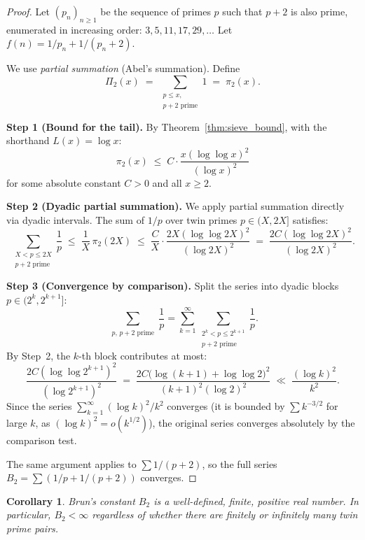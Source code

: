 \documentclass[12pt,a4paper]{amsart}
\newtheorem{corollary}[theorem]{Corollary}
\theoremstyle{definition}
\begin{document}
\begin{proof}
  Let $(p_n)_{n \geq 1}$ be the sequence of primes $p$ such that $p+2$ is
  also prime, enumerated in increasing order: $3, 5, 11, 17, 29, \ldots$
  Let $f(n) = 1/p_n + 1/(p_n+2)$.

  We use \emph{partial summation} (Abel's summation).  Define
  \[
    \Pi_2(x) \;=\; \sum_{\substack{p \leq x,\\ p+2\text{ prime}}} 1
    \;=\; \pi_2(x).
  \]

  \textbf{Step 1 (Bound for the tail).}
  By Theorem~\ref{thm:sieve_bound}, with the shorthand $L(x) = \log x$:
  \[
    \pi_2(x) \;\leq\; C \cdot \frac{x (\log\log x)^2}{(\log x)^2}
  \]
  for some absolute constant $C > 0$ and all $x \geq 2$.

  \textbf{Step 2 (Dyadic partial summation).}
  We apply partial summation directly via dyadic intervals.
  The sum of $1/p$ over twin primes $p \in (X, 2X]$ satisfies:
  \[
    \sum_{\substack{X < p \leq 2X \\ p+2\text{ prime}}} \frac{1}{p}
    \;\leq\; \frac{1}{X}\, \pi_2(2X)
    \;\leq\; \frac{C}{X} \cdot \frac{2X(\log\log 2X)^2}{(\log 2X)^2}
    \;=\; \frac{2C(\log\log 2X)^2}{(\log 2X)^2}.
  \]

  \textbf{Step 3 (Convergence by comparison).}
  Split the series into dyadic blocks $p \in (2^k, 2^{k+1}]$:
  \[
    \sum_{\substack{p,\,p+2\text{ prime}}} \frac{1}{p}
    = \sum_{k=1}^{\infty} \sum_{\substack{2^k < p \leq 2^{k+1}\\ p+2\text{ prime}}}
      \frac{1}{p}.
  \]
  By Step~2, the $k$-th block contributes at most:
  \[
    \frac{2C(\log\log 2^{k+1})^2}{(\log 2^{k+1})^2}
    \;=\; \frac{2C\bigl(\log(k+1) + \log\log 2\bigr)^2}
               {(k+1)^2 (\log 2)^2}
    \;\ll\; \frac{(\log k)^2}{k^2}.
  \]
  Since the series $\sum_{k=1}^{\infty} (\log k)^2 / k^2$ converges
  (it is bounded by $\sum k^{-3/2}$ for large $k$, as $(\log k)^2 = o(k^{1/2})$),
  the original series converges absolutely by the comparison test.

  The same argument applies to $\sum 1/(p+2)$, so the full series
  $B_2 = \sum (1/p + 1/(p+2))$ converges.
\end{proof}

\begin{corollary}\label{cor:brun_finite}
  Brun's constant $B_2$ is a well-defined, finite, positive real number.
  In particular, $B_2 < \infty$ regardless of whether there are finitely
  or infinitely many twin prime pairs.
\end{corollary}
\end{document}
